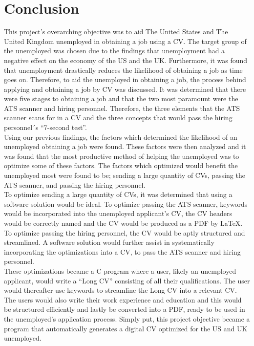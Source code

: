 \section{Conclusion}\label{sec:conclusion}
This project’s overarching objective was to aid The United States and The United Kingdom unemployed in obtaining a job using a CV. 
The target group of the unemployed was chosen due to the findings that unemployment had a negative effect on the economy of the US and the UK.
Furthermore, it was found that unemployment drastically reduces the likelihood of obtaining a job as time goes on.
Therefore, to aid the unemployed in obtaining a job, the process behind applying and obtaining a job by CV was discussed. 
It was determined that there were five stages to obtaining a job and that the two most paramount were the ATS scanner and hiring personnel.
Therefore, the three elements that the ATS scanner scans for in a CV and the three concepts that would pass the hiring personnel´s “7-second test”. \\

Using our previous findings, the factors which determined the likelihood of an unemployed obtaining a job were found. 
These factors were then analyzed and it was found that the most productive method of helping the unemployed was to optimize some of these factors.
The factors which optimized would benefit the unemployed most were found to be; sending a large quantity of CVs, passing the ATS scanner, and passing the hiring personnel. \\

To optimize sending a large quantity of CVs, it was determined that using a software solution would be ideal. 
To optimize passing the ATS scanner, keywords would be incorporated into the unemployed applicant’s CV, the CV headers would be correctly named and the CV would be produced as a PDF by LaTeX. 
To optimize passing the hiring personnel, the CV would be aptly structured and streamlined. 
A software solution would further assist in systematically incorporating the optimizations into a CV, to pass the ATS scanner and hiring personnel. \\

These optimizations became a C program where a user, likely an unemployed applicant, would write a “Long CV” consisting of all their qualifications.
The user would thereafter use keywords to streamline the Long CV into a relevant CV.
The users would also write their work experience and education and this would be structured efficiently and lastly be converted into a PDF, ready to be used in the unemployed's application process. 
Simply put, this project objective became a program that automatically generates a digital CV optimized for the US and UK unemployed. \\

